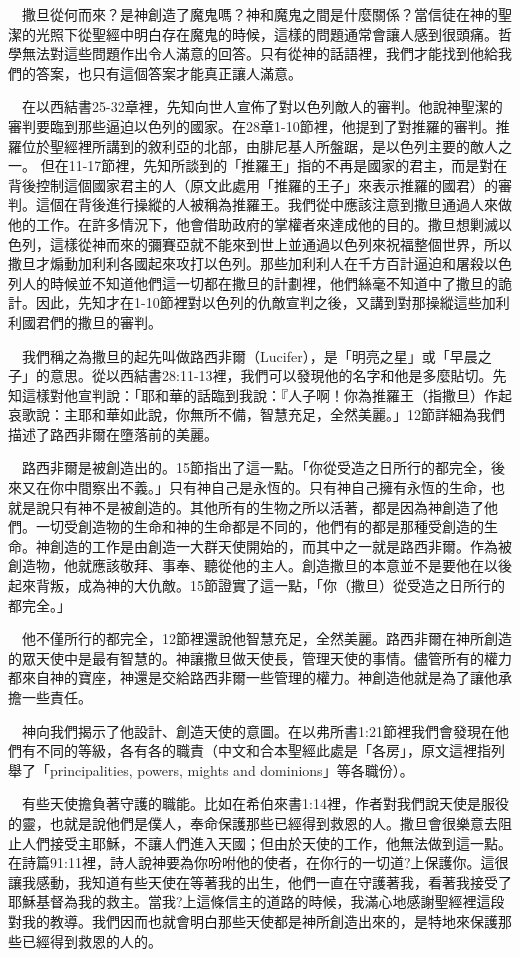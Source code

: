 \documentclass{book}
\begin{document}
　撒旦從何而來？是神創造了魔鬼嗎？神和魔鬼之間是什麼關係？當信徒在神的聖潔的光照下從聖經中明白存在魔鬼的時候，這樣的問題通常會讓人感到很頭痛。哲學無法對這些問題作出令人滿意的回答。只有從神的話語裡，我們才能找到他給我們的答案，也只有這個答案才能真正讓人滿意。

　在以西結書25-32章裡，先知向世人宣佈了對以色列敵人的審判。他說神聖潔的審判要臨到那些逼迫以色列的國家。在28章1-10節裡，他提到了對推羅的審判。推羅位於聖經裡所講到的敘利亞的北部，由腓尼基人所盤踞，是以色列主要的敵人之一。 但在11-17節裡，先知所談到的「推羅王」指的不再是國家的君主，而是對在背後控制這個國家君主的人（原文此處用「推羅的王子」來表示推羅的國君）的審判。這個在背後進行操縱的人被稱為推羅王。我們從中應該注意到撒旦通過人來做他的工作。在許多情況下，他會借助政府的掌權者來達成他的目的。撒旦想剿滅以色列，這樣從神而來的彌賽亞就不能來到世上並通過以色列來祝福整個世界，所以撒旦才煽動加利利各國起來攻打以色列。那些加利利人在千方百計逼迫和屠殺以色列人的時候並不知道他們這一切都在撒旦的計劃裡，他們絲毫不知道中了撒旦的詭計。因此，先知才在1-10節裡對以色列的仇敵宣判之後，又講到對那操縱這些加利利國君們的撒旦的審判。

　我們稱之為撒旦的起先叫做路西非爾（Lucifer），是「明亮之星」或「早晨之子」的意思。從以西結書28:11-13裡，我們可以發現他的名字和他是多麼貼切。先知這樣對他宣判說：「耶和華的話臨到我說：『人子啊！你為推羅王（指撒旦）作起哀歌說：主耶和華如此說，你無所不備，智慧充足，全然美麗。」12節詳細為我們描述了路西非爾在墮落前的美麗。

　路西非爾是被創造出的。15節指出了這一點。「你從受造之日所行的都完全，後來又在你中間察出不義。」只有神自己是永恆的。只有神自己擁有永恆的生命，也就是說只有神不是被創造的。其他所有的生物之所以活著，都是因為神創造了他們。一切受創造物的生命和神的生命都是不同的，他們有的都是那種受創造的生命。神創造的工作是由創造一大群天使開始的，而其中之一就是路西非爾。作為被創造物，他就應該敬拜、事奉、聽從他的主人。創造撒旦的本意並不是要他在以後起來背叛，成為神的大仇敵。15節證實了這一點，「你（撒旦）從受造之日所行的都完全。」

　他不僅所行的都完全，12節裡還說他智慧充足，全然美麗。路西非爾在神所創造的眾天使中是最有智慧的。神讓撒旦做天使長，管理天使的事情。儘管所有的權力都來自神的寶座，神還是交給路西非爾一些管理的權力。神創造他就是為了讓他承擔一些責任。

　神向我們揭示了他設計、創造天使的意圖。在以弗所書1:21節裡我們會發現在他們有不同的等級，各有各的職責（中文和合本聖經此處是「各房」，原文這裡指列舉了「principalities, powers, mights and dominions」等各職份）。

　有些天使擔負著守護的職能。比如在希伯來書1:14裡，作者對我們說天使是服役的靈，也就是說他們是僕人，奉命保護那些已經得到救恩的人。撒旦會很樂意去阻止人們接受主耶穌，不讓人們進入天國；但由於天使的工作，他無法做到這一點。在詩篇91:11裡，詩人說神要為你吩咐他的使者，在你行的一切道?上保護你。這很讓我感動，我知道有些天使在等著我的出生，他們一直在守護著我，看著我接受了耶穌基督為我的救主。當我?上這條信主的道路的時候，我滿心地感謝聖經裡這段對我的教導。我們因而也就會明白那些天使都是神所創造出來的，是特地來保護那些已經得到救恩的人的。
\end{document}

